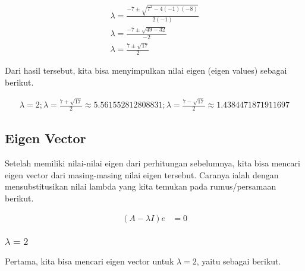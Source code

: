 \documentclass{article}
\begin{document}
\begin{align*}
    \lambda = \frac{-7 \pm \sqrt{7^2 - 4(-1)(-8)}}{2(-1)}\\
    \lambda = \frac{-7 \pm \sqrt{49 - 32}}{-2}\\
    \lambda = \frac{7 \pm \sqrt{17}}{2}
\end{align*}

Dari hasil tersebut, kita bisa menyimpulkan nilai eigen (eigen values) sebagai berikut.

\begin{align*}
    \lambda = 2; \lambda = \frac{7 + \sqrt{17}}{2} \approx 5.561552812808831; \lambda = \frac{7 - \sqrt{17}}{2} \approx 1.4384471871911697
\end{align*}

\subsection{Eigen Vector}
Setelah memiliki nilai-nilai eigen dari perhitungan sebelumnya, kita bisa mencari eigen vector dari masing-masing nilai eigen tersebut. Caranya ialah dengan mensubstitusikan nilai lambda yang kita temukan pada rumus/persamaan berikut.

\begin{align*}
    (A-\lambda I)e &= 0
\end{align*}

\subsubsection{$\lambda = 2$}
Pertama, kita bisa mencari eigen vector untuk $\lambda = 2$, yaitu sebagai berikut.
\end{document}
